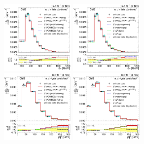 \begin{figure}[hbtp]
     \includegraphics[width=0.32\textwidth]{Chapters/04_Analysis/04b_XSections/images/results/fit/8TeV/ST/central/normalised_xsection_combined_different_generators_with_bkgd_subtraction_results.pdf}\hfill
     \includegraphics[width=0.32\textwidth]{Chapters/04_Analysis/04b_XSections/images/results/fit/8TeV/ST/central/normalised_xsection_combined_systematics_shifts_with_bkgd_subtraction_results.pdf}\\
     \includegraphics[width=0.32\textwidth]{Chapters/04_Analysis/04b_XSections/images/results/fit/8TeV/WPT/central/normalised_xsection_combined_different_generators_with_bkgd_subtraction_results.pdf}\hfill
     \includegraphics[width=0.32\textwidth]{Chapters/04_Analysis/04b_XSections/images/results/fit/8TeV/WPT/central/normalised_xsection_combined_systematics_shifts_with_bkgd_subtraction_results.pdf}\hfill

\end{figure}
